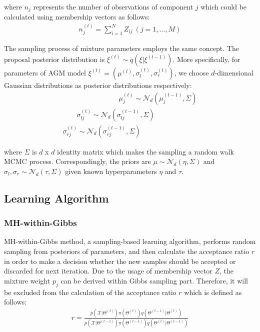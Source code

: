 \documentclass[conference]{IEEEtran}
\begin{document}
where $n_j$ represents the number of observations of component $j$ which could be calculated using membership vectors as follows:
\begin{align}
n_j^{(t)} = \sum_{i=1}^NZ_{ij}\ (j = 1,...,M) 
\label{eq:nj}
\end{align}

The sampling process of mixture parameters employs the same concept. The proposal posterior distribution is  $\xi^{(t)} \sim q(\xi|\xi^{(t-1)})$. More specifically, for parameters of AGM model $\xi^{(t)} = (\mu^{(t)}, \sigma_{l}^{(t)}, \sigma_{r}^{(t)})$, we choose $d$-dimensional Gaussian distributions as posterior distributions respectively:
\begin{multline}
\qquad\qquad\qquad\qquad\mu_j^{(t)} \sim \mathcal{N}_d(\mu_j^{(t-1)},\Sigma) \\
\qquad\sigma_{lj}^{(t)} \sim \mathcal{N}_d(\sigma_{lj}^{(t-1)},\Sigma) \\
\sigma_{rj}^{(t)} \sim \mathcal{N}_d(\sigma_{rj}^{(t-1)},\Sigma)\qquad\qquad\quad
\label{eq:posters}
\end{multline}

where $\Sigma$ is $d$ x $d$ identity matrix which makes the sampling a random walk MCMC process. Correspondingly, the priors are $\mu \sim \mathcal{N}_d(\eta,\Sigma)$ and $\sigma_l, \sigma_r \sim \mathcal{N}_d(\tau,\Sigma)$ given known hyperparameters $\eta$ and $\tau$.


\subsection{Learning Algorithm}
\subsubsection*{MH-within-Gibbs}
MH-within-Gibbs method, a sampling-based learning algorithm,  performs random sampling from posteriors of parameters, and then calculate the acceptance ratio $r$ in order to make a decision whether the new samples should be accepted or discarded for next iteration. Due to the usage of membership vector $Z$, the mixture weight $p_j$ can be derived within Gibbs sampling part. Therefore, it will be excluded from the calculation of the acceptance ratio $r$ which is defined as follows:
\begin{align}
r = \frac{p(\mathcal{X}|\Theta^{(t)})\pi(\Theta^{(t)})q(\Theta^{(t-1)}|\Theta^{(t)})}{p(\mathcal{X}|\Theta^{(t-1)})\pi(\Theta^{(t-1)})q(\Theta^{(t)}|\Theta^{(t-1)})}
\label{eq:r}
\end{align}
\end{document}

